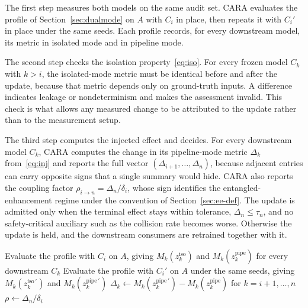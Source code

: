 \documentclass[conference]{IEEEtran}
\begin{document}
The first step measures both models on the same audit set. CARA evaluates the
profile of Section~\ref{sec:dualmode} on $A$ with $C_i$ in place, then repeats it
with $C_i'$ in place under the same seeds. Each profile records, for every
downstream model, its metric in isolated mode and in pipeline mode.

The second step checks the isolation property~\eqref{eq:iso}. For every frozen
model $C_k$ with $k>i$, the isolated-mode metric must be identical before and
after the update, because that metric depends only on ground-truth inputs. A
difference indicates leakage or nondeterminism and makes the assessment invalid.
This check is what allows any measured change to be attributed to the update
rather than to the measurement setup.

The third step computes the injected effect and decides. For every downstream
model $C_k$, CARA computes the change in its pipeline-mode metric $\Delta_k$
from~\eqref{eq:inj} and reports the full vector $(\Delta_{i+1}, \dots, \Delta_n)$,
because adjacent entries can carry opposite signs that a single summary would hide. CARA also reports the coupling factor
$\rho_{i\to n} = \Delta_n / \delta_i$, whose sign identifies the
entangled-enhancement regime under the convention of
Section~\ref{sec:ee-def}. The update is admitted only when the terminal effect
stays within tolerance, $\Delta_n \le \tau_n$, and no safety-critical auxiliary
such as the collision rate becomes worse. Otherwise the update is held, and the
downstream consumers are retrained together with it.

\begin{algorithm}[htbp]
\SetAlgoLined
\DontPrintSemicolon
{}
Evaluate the profile with $C_i$ on $A$, giving $M_k(z_k^{\text{iso}})$ and
$M_k(z_k^{\text{pipe}})$ for every downstream $C_k$\;
Evaluate the profile with $C_i'$ on $A$ under the same seeds, giving
$M_k(z_k^{\text{iso}\,\prime})$ and $M_k(z_k^{\text{pipe}\,\prime})$\;
$\Delta_k \leftarrow M_k(z_k^{\text{pipe}\,\prime}) - M_k(z_k^{\text{pipe}})$
\quad for $k=i{+}1,\dots,n$\;
$\rho \leftarrow \Delta_n / \delta_i$\;
\caption{Cascade-Aware Retraining Assessment (CARA)}
\label{alg:cara}
\end{algorithm}
\end{document}
